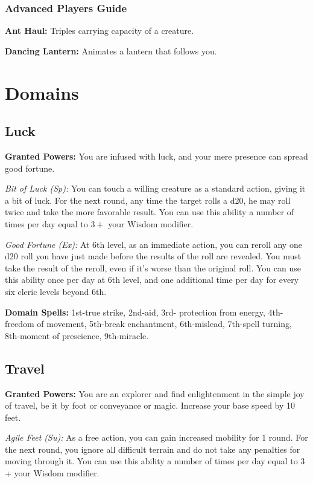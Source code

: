 \documentclass{spelllist}
\begin{document}
  \subsubsection*{Advanced Players Guide}
  \begin{flushleft}
    \textbf{Ant Haul:} Triples carrying capacity of a creature.
    
    \textbf{Dancing Lantern:} Animates a lantern that follows you.
  \end{flushleft}
  
  \section*{Domains}
  \subsection*{Luck}
  \textbf{Granted Powers:} You are infused with luck, and your
mere presence can spread good fortune.

  \emph{Bit of Luck (Sp):} You can touch a willing creature as a
  standard action, giving it a bit of luck. For the next round,
  any time the target rolls a d20, he may roll twice and take
  the more favorable result. You can use this ability a number
  of times per day equal to $3 +$ your Wisdom modifier.
  
  \emph{Good Fortune (Ex):} At 6th level, as an immediate action,
  you can reroll any one d20 roll you have just made before
  the results of the roll are revealed. You must take the result
  of the reroll, even if it’s worse than the original roll. You can
  use this ability once per day at 6th level, and one additional
  time per day for every six cleric levels beyond 6th.
  
  \textbf{Domain Spells:} 1st-true strike, 2nd-aid, 3rd-
  protection from energy, 4th-freedom of movement, 5th-break
  enchantment, 6th-mislead, 7th-spell turning, 8th-moment
  of prescience, 9th-miracle.
  
  \subsection*{Travel}
  \textbf{Granted Powers:} You are an explorer and find
  enlightenment in the simple joy of travel, be it by foot or
  conveyance or magic. Increase your base speed by 10 feet.
  
  \emph{Agile Feet (Su):} As a free action, you can gain increased
  mobility for 1 round. For the next round, you ignore all
  difficult terrain and do not take any penalties for moving
  through it. You can use this ability a number of times per
  day equal to 3 + your Wisdom modifier.
  
\end{document}
